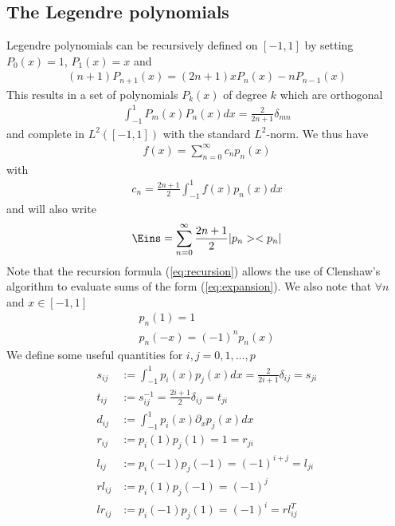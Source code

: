\documentclass[a4paper,12pt]{scrartcl}
\begin{document}
\subsection{ The Legendre polynomials}
Legendre polynomials can be recursively defined on $[-1,1]$ by setting
$P_0(x) = 1$, $P_1(x) = x$ and
\begin{align}
    (n+1)P_{n+1}(x) = (2n+1)xP_n(x) - nP_{n-1}(x)
    \label{eq:recursion}
\end{align}
This results in a set of polynomials $P_k(x)$ of degree $k$ which are orthogonal
\begin{align}
    \int_{-1}^{1} P_m(x)P_n(x) dx = \frac{2}{2n+1}\delta_{mn} 
    \label{eq:orthogonal}
\end{align}
and complete in $L^2([-1,1])$ with the standard $L^2$-norm. We thus have
\begin{align}
    f(x) = \sum_{n=0}^\infty c_n p_n(x)
    \label{eq:expansion}
\end{align} with
\begin{align}
    c_n = \frac{2n+1}{2}\int_{-1}^{1} f(x)p_n(x)dx
    \label{eq:coefficient}
\end{align}
and will also write
\begin{align}
    \Eins = \sum_{n=0}^\infty \frac{2n+1}{2}|p_n><p_n|
    \label{eq:completeness}
\end{align}
Note that the recursion formula (\ref{eq:recursion}) allows the use of 
Clenshaw's algorithm to evaluate sums of the form (\ref{eq:expansion}).
We also note that $\forall n$ and $x\in[-1,1]$
\begin{subequations}
\begin{align}
    p_n(1) = 1 \\
    p_n(-x) = (-1)^np_n(x)
\end{align}
\label{eq:boundaries}
\end{subequations}
We define some useful quantities for $i,j=0,1,\dots,p$
\begin{subequations}
    \begin{align}
        s_{ij} &:= \int_{-1}^1 p_i(x)p_j(x) dx = \frac{2}{2i+1}\delta_{ij} = s_{ji}\\ 
        t_{ij} &:= s^{-1}_{ij} = \frac{2i+1}{2}\delta_{ij} = t_{ji}\\
        d_{ij} &:= \int_{-1}^1 p_i(x)\partial_xp_j(x) dx\\
        r_{ij} &:= p_i(1)p_j(1) = 1 = r_{ji}\\
        l_{ij} &:= p_i(-1)p_j(-1) = (-1)^{i+j} = l_{ji}\\
        rl_{ij}&:= p_i(1)p_j(-1) = (-1)^j\\
        lr_{ij}&:= p_i(-1)p_j(1) = (-1)^i = rl^T_{ij}
        \label{eq:legendre_operators}
    \end{align}
\end{subequations}
\end{document}
